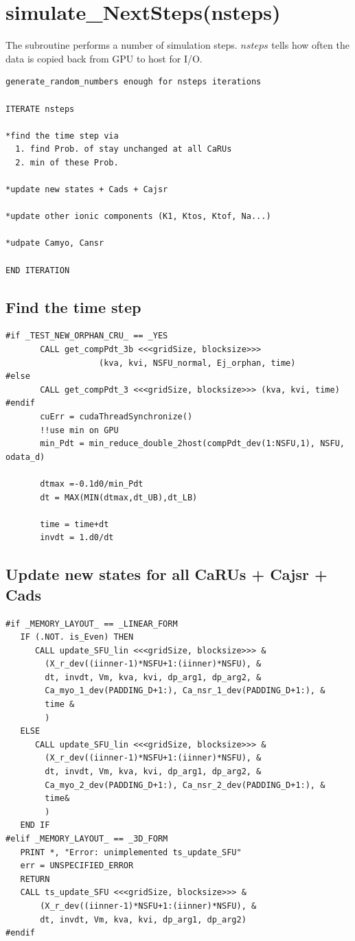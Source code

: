 \section{simulate\_NextSteps(nsteps)}
\label{sec:simulate_nextsteps}

The subroutine performs a number of simulation steps. $nsteps$ tells how often
the data is copied back from GPU to host for I/O.
\begin{lstlisting}
generate_random_numbers enough for nsteps iterations

ITERATE nsteps

*find the time step via 
  1. find Prob. of stay unchanged at all CaRUs
  2. min of these Prob.

*update new states + Cads + Cajsr

*update other ionic components (K1, Ktos, Ktof, Na...)

*udpate Camyo, Cansr

END ITERATION
\end{lstlisting}

\subsection{Find the time step}
\label{sec:time_step}

\begin{lstlisting}
#if _TEST_NEW_ORPHAN_CRU_ == _YES 
       CALL get_compPdt_3b <<<gridSize, blocksize>>> 
                   (kva, kvi, NSFU_normal, Ej_orphan, time)
#else
       CALL get_compPdt_3 <<<gridSize, blocksize>>> (kva, kvi, time)          
#endif
       cuErr = cudaThreadSynchronize()
       !!use min on GPU
       min_Pdt = min_reduce_double_2host(compPdt_dev(1:NSFU,1), NSFU, odata_d)

       dtmax =-0.1d0/min_Pdt
       dt = MAX(MIN(dtmax,dt_UB),dt_LB)
       
       time = time+dt
       invdt = 1.d0/dt
\end{lstlisting}

\subsection{Update new states for all CaRUs + Cajsr + Cads}
\label{sec:update_SFU}

\begin{lstlisting}
#if _MEMORY_LAYOUT_ == _LINEAR_FORM
   IF (.NOT. is_Even) THEN
      CALL update_SFU_lin <<<gridSize, blocksize>>> &
        (X_r_dev((iinner-1)*NSFU+1:(iinner)*NSFU), &
        dt, invdt, Vm, kva, kvi, dp_arg1, dp_arg2, &
        Ca_myo_1_dev(PADDING_D+1:), Ca_nsr_1_dev(PADDING_D+1:), &
        time &
        )
   ELSE
      CALL update_SFU_lin <<<gridSize, blocksize>>> &
        (X_r_dev((iinner-1)*NSFU+1:(iinner)*NSFU), &
        dt, invdt, Vm, kva, kvi, dp_arg1, dp_arg2, &
        Ca_myo_2_dev(PADDING_D+1:), Ca_nsr_2_dev(PADDING_D+1:), &
        time&
        )
   END IF
#elif _MEMORY_LAYOUT_ == _3D_FORM
   PRINT *, "Error: unimplemented ts_update_SFU"
   err = UNSPECIFIED_ERROR
   RETURN
   CALL ts_update_SFU <<<gridSize, blocksize>>> &
       (X_r_dev((iinner-1)*NSFU+1:(iinner)*NSFU), &
       dt, invdt, Vm, kva, kvi, dp_arg1, dp_arg2)
#endif
\end{lstlisting}

